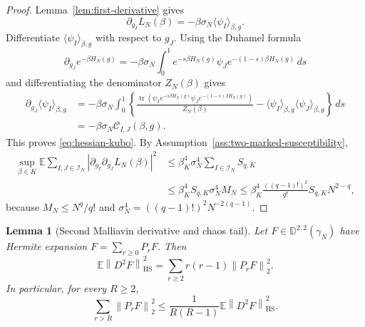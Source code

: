 \documentclass[11pt]{article}
\newtheorem{lemma}[theorem]{Lemma}
\newcommand{\E}{\mathbb{E}}
\newcommand{\tr}{\operatorname{tr}}
\newcommand{\calI}{\mathcal{I}}
\newcommand{\dd}{\,d}
\newcommand{\norm}[1]{\left\lVert #1\right\rVert}
\newcommand{\HS}{\mathrm{HS}}
\begin{document}
\begin{proof}
  Lemma~\ref{lem:first-derivative} gives
  \begin{equation}\label{eq:first-derivative-before-kubo}
    \partial_{g_I}L_N(\beta)
    =
    -\beta\sigma_N\langle\psi_I\rangle_{\beta,g}.
  \end{equation}
  Differentiate $\langle\psi_I\rangle_{\beta,g}$ with respect to $g_J$.
  Using the Duhamel formula
  \begin{equation}\label{eq:duhamel-kubo}
    \partial_{g_J}e^{-\beta H_N(g)}
    =
    -\beta\sigma_N
    \int_0^1
      e^{-s\beta H_N(g)}\psi_J e^{-(1-s)\beta H_N(g)}
    \dd s
  \end{equation}
  and differentiating the denominator $Z_N(\beta)$ gives
  \begin{align}\label{eq:derivative-thermal-average}
    \partial_{g_J}\langle\psi_I\rangle_{\beta,g}
    &=
    -\beta\sigma_N
    \int_0^1
    \left\{
      \frac{
        \tr\left(\psi_I e^{-s\beta H_N(g)}
        \psi_J e^{-(1-s)\beta H_N(g)}\right)
      }{Z_N(\beta)}
      -
      \langle\psi_I\rangle_{\beta,g}
      \langle\psi_J\rangle_{\beta,g}
    \right\}
    \dd s \\
    &=
    -\beta\sigma_N\mathcal C_{I,J}(\beta,g).
  \end{align}
  This proves \eqref{eq:hessian-kubo}.  By
  Assumption~\ref{ass:two-marked-susceptibility},
  \begin{align}\label{eq:hessian-hs-bound-proof}
    \sup_{\beta\in K}
    \E
    \sum_{I,J\in\calI_N}
    \left|
      \partial_{g_I}\partial_{g_J}L_N(\beta)
    \right|^2
    &\leq
    \beta_K^4\sigma_N^4
    \sum_{I\in\calI_N}
    S_{q,K} \\
    &\leq
    \beta_K^4S_{q,K}\sigma_N^4M_N
    \leq
    \beta_K^4\frac{((q-1)!)^2}{q!}S_{q,K}N^{2-q},
  \end{align}
  because $M_N\leq N^q/q!$ and
  $\sigma_N^4=((q-1)!)^2N^{-2(q-1)}$.
\end{proof}

\begin{lemma}[Second Malliavin derivative and chaos tail]
  \label{lem:malliavin-second-tail}
  Let $F\in\mathbb D^{2,2}(\gamma_N)$ have Hermite expansion
  $F=\sum_{r\geq0}P_rF$.  Then
  \begin{equation}\label{eq:second-malliavin-chaos}
    \E\norm{D^2F}_{\HS}^2
    =
    \sum_{r\geq2}r(r-1)\norm{P_rF}_2^2.
  \end{equation}
  In particular, for every $R\geq2$,
  \begin{equation}\label{eq:tail-from-hessian}
    \sum_{r>R}\norm{P_rF}_2^2
    \leq
    \frac{1}{R(R-1)}
    \E\norm{D^2F}_{\HS}^2.
  \end{equation}
\end{lemma}
\end{document}
